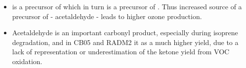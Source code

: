 \begin{GreyBox}
\begin{block}{}
\begin{columns}[c]
\begin{WhiteBox}
\begin{itemize}
                        \item {} is a precursor of  which in turn is a precursor of . Thus increased source of a precursor of  - acetaldehyde - leads to higher ozone production.\vspace{9mm}
                        \item Acetaldehyde is an important carbonyl product, especially during isoprene degradation, and in CB05 and RADM2 it as a much higher yield, due to a lack of representation or underestimation of the ketone yield from VOC oxidation.\vspace{9mm}
                    \end{itemize}
                \end{WhiteBox}
        \end{columns}
    \end{block}
\end{GreyBox}
